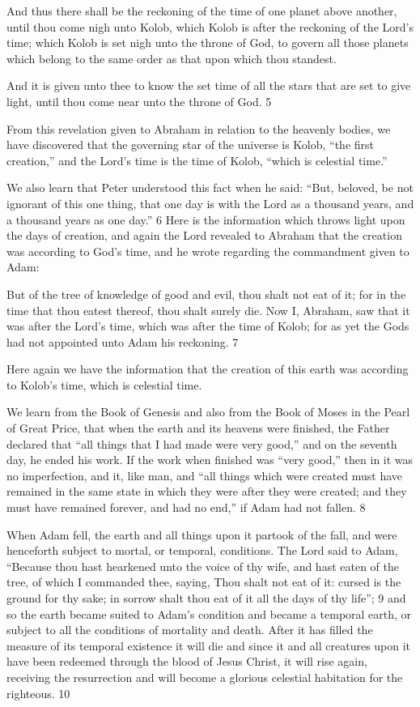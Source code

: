 And thus there shall be the reckoning of the time of one planet above another, until thou
come nigh unto Kolob, which Kolob is after the reckoning of the Lord's time; which Kolob is
set nigh unto the throne of God, to govern all those planets which belong to the same order as
that upon which thou standest.

And it is given unto thee to know the set time of all the stars that are set to give light, until
thou come near unto the throne of God. 5

From this revelation given to Abraham in relation to the heavenly bodies, we have
discovered that the governing star of the universe is Kolob, ``the first creation,'' and the Lord's
time is the time of Kolob, ``which is celestial time.''

We also learn that Peter understood this fact when he said: ``But, beloved, be not ignorant of
this one thing, that one day is with the Lord as a thousand years, and a thousand years as one
day.'' 6 Here is the information which throws light upon the days of creation, and again the
Lord revealed to Abraham that the creation was according to God's time, and he wrote
regarding the commandment given to Adam:

But of the tree of knowledge of good and evil, thou shalt not eat of it; for in the time that thou
eatest thereof, thou shalt surely die. Now I, Abraham, saw that it was after the Lord's time,
which was after the time of Kolob; for as yet the Gods had not appointed unto Adam his
reckoning. 7

Here again we have the information that the creation of this earth was according to Kolob's
time, which is celestial time.

We learn from the Book of Genesis and also from the Book of Moses in the Pearl of Great
Price, that when the earth and its heavens were finished, the Father declared that ``all things
that I had made were very good,'' and on the seventh day, he ended his work. If the work
when finished was ``very good,'' then in it was no imperfection, and it, like man, and ``all
things which were created must have remained in the same state in which they were after
they were created; and they must have remained forever, and had no end,'' if Adam had not
fallen. 8

When Adam fell, the earth and all things upon it partook of the fall, and were henceforth
subject to mortal, or temporal, conditions. The Lord said to Adam, ``Because thou hast
hearkened unto the voice of thy wife, and hast eaten of the tree, of which I commanded thee,
saying, Thou shalt not eat of it: cursed is the ground for thy sake; in sorrow shalt thou eat of
it all the days of thy life''; 9 and so the earth became suited to Adam's condition and became a
temporal earth, or subject to all the conditions of mortality and death. After it has filled the
measure of its temporal existence it will die and since it and all creatures upon it have been
redeemed through the blood of Jesus Christ, it will rise again, receiving the resurrection and
will become a glorious celestial habitation for the righteous. 10

